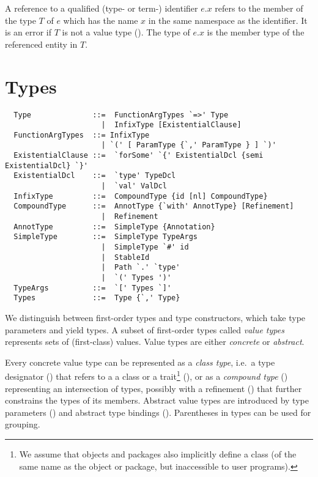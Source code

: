A reference to a qualified (type- or term-) identifier $e.x$ refers to
the member of the type $T$ of $e$ which has the name $x$ in the same
namespace as the identifier. It is an error if $T$ is not a value type
(). The type of $e.x$ is the member type of the
referenced entity in $T$.

\chapter{\label{sec:types}Types}

\syntax\begin{lstlisting}
  Type              ::=  FunctionArgTypes `=>' Type
                      |  InfixType [ExistentialClause]
  FunctionArgTypes  ::= InfixType
                      | `(' [ ParamType {`,' ParamType } ] `)'
  ExistentialClause ::=  `forSome' `{' ExistentialDcl {semi ExistentialDcl} `}'
  ExistentialDcl    ::=  `type' TypeDcl 
                      |  `val' ValDcl
  InfixType         ::=  CompoundType {id [nl] CompoundType}
  CompoundType      ::=  AnnotType {`with' AnnotType} [Refinement]
                      |  Refinement
  AnnotType         ::=  SimpleType {Annotation}
  SimpleType        ::=  SimpleType TypeArgs
                      |  SimpleType `#' id
                      |  StableId
                      |  Path `.' `type'
                      |  `(' Types ')'
  TypeArgs          ::=  `[' Types `]'
  Types             ::=  Type {`,' Type}
\end{lstlisting}

We distinguish between first-order types and type constructors, which
take type parameters and yield types. A subset of first-order types
called {\em value types} represents sets of (first-class) values.
Value types are either {\em concrete} or {\em abstract}. 

Every concrete value type can be represented as a {\em class type}, i.e.\ a
type designator () that refers to a
a class or a trait\footnote{We assume that objects and packages also implicitly
define a class (of the same name as the object or package, but
inaccessible to user programs).} (), or as a {\em
compound type} () representing an
intersection of types, possibly with a refinement
() that further constrains the types of its
members.
Abstract value types are introduced by type parameters () 
and abstract type bindings (). Parentheses in types can be used for
grouping.

